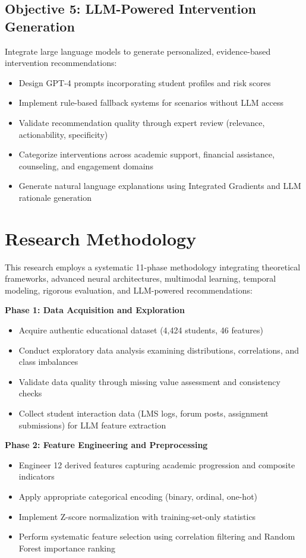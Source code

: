 \subsection{Objective 5: LLM-Powered Intervention Generation}

Integrate large language models to generate personalized, evidence-based intervention recommendations:
\begin{itemize}
\item Design GPT-4 prompts incorporating student profiles and risk scores
\item Implement rule-based fallback systems for scenarios without LLM access
\item Validate recommendation quality through expert review (relevance, actionability, specificity)
\item Categorize interventions across academic support, financial assistance, counseling, and engagement domains
\item Generate natural language explanations using Integrated Gradients and LLM rationale generation
\end{itemize}

\section{Research Methodology}

This research employs a systematic 11-phase methodology integrating theoretical frameworks, advanced neural architectures, multimodal learning, temporal modeling, rigorous evaluation, and LLM-powered recommendations:

\textbf{Phase 1: Data Acquisition and Exploration}
\begin{itemize}
\item Acquire authentic educational dataset (4,424 students, 46 features)
\item Conduct exploratory data analysis examining distributions, correlations, and class imbalances
\item Validate data quality through missing value assessment and consistency checks
\item Collect student interaction data (LMS logs, forum posts, assignment submissions) for LLM feature extraction
\end{itemize}

\textbf{Phase 2: Feature Engineering and Preprocessing}
\begin{itemize}
\item Engineer 12 derived features capturing academic progression and composite indicators
\item Apply appropriate categorical encoding (binary, ordinal, one-hot)
\item Implement Z-score normalization with training-set-only statistics
\item Perform systematic feature selection using correlation filtering and Random Forest importance ranking
\end{itemize}

